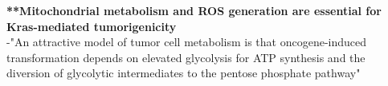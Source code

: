 \documentclass[11pt,a4paper]{article}
\begin{document}
\textbf{**Mitochondrial metabolism and ROS generation are essential for Kras-mediated tumorigenicity}\\

-"An attractive model of tumor cell metabolism is that oncogene-induced transformation depends on elevated glycolysis for ATP synthesis and the diversion of glycolytic intermediates to the pentose phosphate pathway"\\
\end{document}
